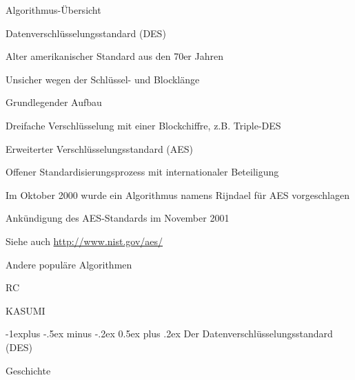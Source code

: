 \documentclass[a4paper]{article}
\makeatletter
\renewcommand{\subsection}{\@startsection{subsection}{2}{0mm}%
 {-1explus -.5ex minus -.2ex}%
 {0.5ex plus .2ex}%
 {\normalfont\normalsize\bfseries}}
\makeatother
\begin{document}
\begin{multicols}{3}
      Algorithmus-Übersicht

      \begin{itemize*}
            \item Datenverschlüsselungsstandard (DES)
            \begin{itemize*}
                  \item Alter amerikanischer Standard aus den 70er Jahren
                  \item Unsicher wegen der Schlüssel- und Blocklänge
                  \item Grundlegender Aufbau
                  \item Dreifache Verschlüsselung mit einer Blockchiffre, z.B. Triple-DES
            \end{itemize*}
            \item Erweiterter Verschlüsselungsstandard (AES)
            \begin{itemize*}
                  \item Offener Standardisierungsprozess mit internationaler Beteiligung
                  \item Im Oktober 2000 wurde ein Algorithmus namens Rijndael für AES vorgeschlagen
                  \item Ankündigung des AES-Standards im November 2001
                  \item Siehe auch \href{http://www.nist.gov/aes/}{http://www.nist.gov/aes/}
            \end{itemize*}
            \item Andere populäre Algorithmen
            \begin{itemize*}
                  \item RC
                  \item KASUMI
            \end{itemize*}
      \end{itemize*}


      \subsection{Der Datenverschlüsselungsstandard
            (DES)}

      Geschichte


\end{multicols}
\end{document}
